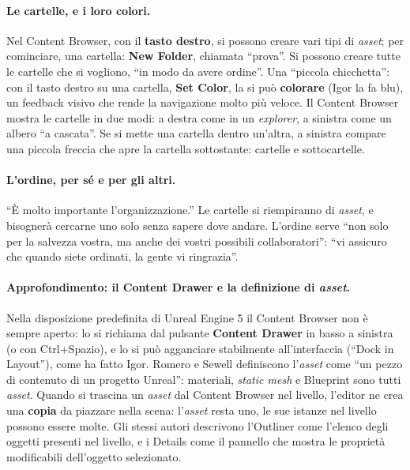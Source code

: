\paragraph{Le cartelle, e i loro colori.} Nel Content Browser, con il \textbf{tasto
destro}, si possono creare vari tipi di \emph{asset}; per cominciare, una cartella:
\textbf{New Folder}, chiamata ``prova''. Si possono creare tutte le cartelle che si
vogliono, ``in modo da avere ordine''. Una ``piccola chicchetta'': con il tasto destro
su una cartella, \textbf{Set Color}, la si può \textbf{colorare} (Igor la fa blu), un
feedback visivo che rende la navigazione molto più veloce. Il Content Browser mostra le
cartelle in due modi: a destra come in un \emph{explorer}, a sinistra come un albero ``a
cascata''. Se si mette una cartella dentro un'altra, a sinistra compare una piccola
freccia che apre la cartella sottostante: cartelle e sottocartelle.

\paragraph{L'ordine, per sé e per gli altri.} ``È molto importante l'organizzazione.'' Le
cartelle si riempiranno di \emph{asset}, e bisognerà cercarne uno solo senza sapere dove
andare. L'ordine serve ``non solo per la salvezza vostra, ma anche dei vostri possibili
collaboratori'': ``vi assicuro che quando siete ordinati, la gente vi ringrazia''.

\paragraph{Approfondimento: il Content Drawer e la definizione di \emph{asset}.} Nella
disposizione predefinita di Unreal Engine 5 il Content Browser non è sempre aperto: lo si
richiama dal pulsante \textbf{Content Drawer} in basso a sinistra (o con
Ctrl+Spazio), e lo si può agganciare stabilmente all'interfaccia (``Dock in Layout''),
come ha fatto Igor. Romero e Sewell definiscono l'\emph{asset} come ``un pezzo di
contenuto di un progetto Unreal'': materiali, \emph{static mesh} e Blueprint sono tutti
\emph{asset}. Quando si trascina un \emph{asset} dal Content Browser nel livello,
l'editor ne crea una \textbf{copia} da piazzare nella scena: l'\emph{asset} resta uno, le
sue istanze nel livello possono essere molte. Gli stessi autori descrivono l'Outliner
come l'elenco degli oggetti presenti nel livello, e i Details come il pannello che
mostra le proprietà modificabili dell'oggetto selezionato.

